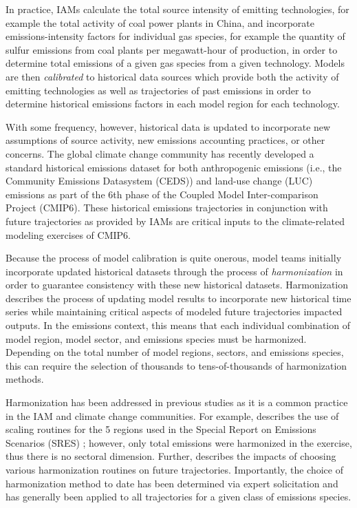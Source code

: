 In practice, IAMs calculate the total source intensity of emitting technologies,
for example the total activity of coal power plants in China, and incorporate
emissions-intensity factors for individual gas species, for example the quantity
of sulfur emissions from coal plants per megawatt-hour of production, in order
to determine total emissions of a given gas species from a given
technology. Models are then \textit{calibrated} to historical data sources which
provide both the activity of emitting technologies as well as trajectories of
past emissions in order to determine historical emissions factors in each model
region for each technology.

With some frequency, however, historical data is updated to incorporate new
assumptions of source activity, new emissions accounting practices, or other
concerns. The global climate change community has recently developed a standard
historical emissions dataset for both anthropogenic emissions (i.e., the
Community Emissions Datasystem (CEDS)) \cite{hoesly_historical_2017} and
land-use change (LUC) emissions \cite{van_marle_historic_2017} as part of the
6th phase of the Coupled Model Inter-comparison Project (CMIP6). These
historical emissions trajectories in conjunction with future trajectories as
provided by IAMs are critical inputs to the climate-related modeling exercises
of CMIP6.

Because the process of model calibration is quite onerous, model teams initially
incorporate updated historical datasets through the process of
\textit{harmonization} in order to guarantee consistency with these new
historical datasets. Harmonization describes the process of updating model
results to incorporate new historical time series while maintaining critical
aspects of modeled future trajectories impacted outputs. In the emissions
context, this means that each individual combination of model region, model
sector, and emissions species must be harmonized. Depending on the total number
of model regions, sectors, and emissions species, this can require the selection
of thousands to tens-of-thousands of harmonization methods.

Harmonization has been addressed in previous studies as it is a common practice
in the IAM and climate change communities. For example,
\cite{meinshausen_rcp_2011} describes the use of scaling routines for the 5
regions used in the Special Report on Emissions Scenarios (SRES)
\cite{nakicenovic2000}; however, only total emissions were harmonized in the
exercise, thus there is no sectoral dimension. Further,
\cite{rogelj_discrepancies_2011} describes the impacts of choosing various
harmonization routines on future trajectories. Importantly, the choice of
harmonization method to date has been determined via expert solicitation and has
generally been applied to all trajectories for a given class of emissions
species.

